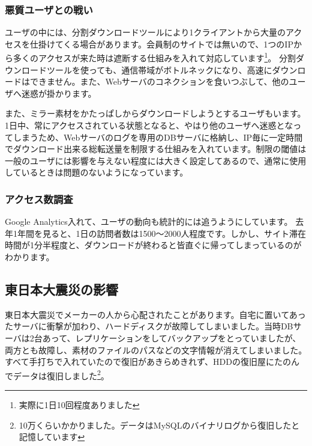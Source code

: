\subsubsection{悪質ユーザとの戦い}

ユーザの中には、分割ダウンロードツールにより1クライアントから大量のアクセスを仕掛けてくる場合があります。会員制のサイトでは無いので、1つのIPから多くのアクセスが来た時は遮断する仕組みを入れて対応しています\footnote{実際に1日10回程度ありました}。
分割ダウンロードツールを使っても、通信帯域がボトルネックになり、高速にダウンロードはできません。また、Webサーバのコネクションを食いつぶして、他のユーザへ迷惑が掛かります。

また、ミラー素材をかたっぱしからダウンロードしようとするユーザもいます。1日中、常にアクセスされている状態となると、やはり他のユーザへ迷惑となってしまうため、Webサーバのログを専用のDBサーバに格納し、IP毎に一定時間でダウンロード出来る総転送量を制限する仕組みを入れています。制限の閾値は一般のユーザには影響を与えない程度には大きく設定してあるので、通常に使用しているときは問題のないようになっています。


\subsubsection{アクセス数調査}
Google Analytics入れて、ユーザの動向も統計的には追うようにしています。
去年1年間を見ると、1日の訪問者数は1500～2000人程度です。しかし、サイト滞在時間が1分半程度と、ダウンロードが終わると皆直ぐに帰ってしまっているのがわかります。

\subsection{東日本大震災の影響}
%

東日本大震災でメーカーの人から心配されたことがあります。自宅に置いてあったサーバに衝撃が加わり、ハードディスクが故障してしまいました。当時DBサーバは2台あって、レプリケーションをしてバックアップをとっていましたが、両方とも故障し、素材のファイルのパスなどの文字情報が消えてしまいました。すべて手打ちで入れていたので復旧があきらめきれず、HDDの復旧屋にたのんでデータは復旧しました\footnote{10万くらいかかりました。データはMySQLのバイナリログから復旧したと記憶しています}。

